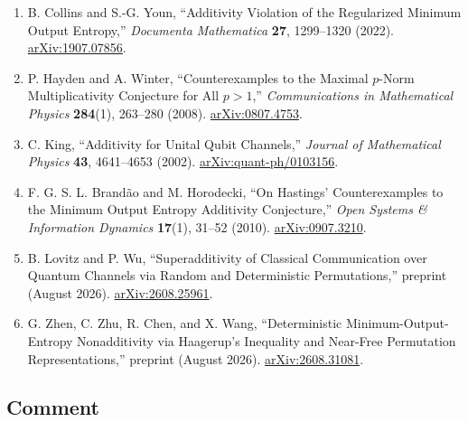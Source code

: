 \begin{enumerate}[label={},leftmargin=4.8em,labelsep=0.5em]
  \item[\textup{[CY22]}]\label{ref:dmin-collins-youn}
  B. Collins and S.-G. Youn,
  ``Additivity Violation of the Regularized Minimum Output Entropy,''
  \emph{Documenta Mathematica} \textbf{27}, 1299--1320 (2022).
  \href{https://arxiv.org/abs/1907.07856}{arXiv:1907.07856}.

  \item[\textup{[HW08]}]\label{ref:dmin-hayden-winter}
  P. Hayden and A. Winter,
  ``Counterexamples to the Maximal $p$-Norm Multiplicativity Conjecture for
  All $p>1$,'' \emph{Communications in Mathematical Physics} \textbf{284}(1),
  263--280 (2008).
  \href{https://arxiv.org/abs/0807.4753}{arXiv:0807.4753}.

  \item[\textup{[Kin02]}]\label{ref:dmin-king}
  C. King,
  ``Additivity for Unital Qubit Channels,'' \emph{Journal of Mathematical
  Physics} \textbf{43}, 4641--4653 (2002).
  \href{https://arxiv.org/abs/quant-ph/0103156}{arXiv:quant-ph/0103156}.

  \item[\textup{[BH10]}]\label{ref:dmin-brandao-horodecki}
  F. G. S. L. Brandão and M. Horodecki,
  ``On Hastings' Counterexamples to the Minimum Output Entropy Additivity
  Conjecture,'' \emph{Open Systems & Information Dynamics} \textbf{17}(1),
  31--52 (2010).
  \href{https://arxiv.org/abs/0907.3210}{arXiv:0907.3210}.

  \item[\textup{[LovWu26]}]\label{ref:dmin-lovwu}
  B. Lovitz and P. Wu,
  ``Superadditivity of Classical Communication over Quantum Channels via
  Random and Deterministic Permutations,'' preprint (August 2026).
  \href{https://arxiv.org/abs/2608.25961}{arXiv:2608.25961}.

  \item[\textup{[ZZCW26]}]\label{ref:dmin-zzcw}
  G. Zhen, C. Zhu, R. Chen, and X. Wang,
  ``Deterministic Minimum-Output-Entropy Nonadditivity via Haagerup's
  Inequality and Near-Free Permutation Representations,'' preprint
  (August 2026).
  \href{https://arxiv.org/abs/2608.31081}{arXiv:2608.31081}.
\end{enumerate}

\subsection*{Comment}

